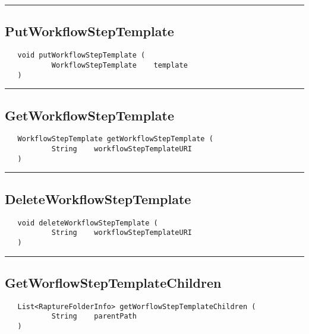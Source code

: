 \rule{15cm}{2pt}
\subsection{PutWorkflowStepTemplate}
\label{Api:PutWorkflowStepTemplate}
\begin{verbatim}
   void putWorkflowStepTemplate (
           WorkflowStepTemplate    template
   )
\end{verbatim}



\rule{15cm}{2pt}
\subsection{GetWorkflowStepTemplate}
\label{Api:GetWorkflowStepTemplate}
\begin{verbatim}
   WorkflowStepTemplate getWorkflowStepTemplate (
           String    workflowStepTemplateURI
   )
\end{verbatim}



\rule{15cm}{2pt}
\subsection{DeleteWorkflowStepTemplate}
\label{Api:DeleteWorkflowStepTemplate}
\begin{verbatim}
   void deleteWorkflowStepTemplate (
           String    workflowStepTemplateURI
   )
\end{verbatim}



\rule{15cm}{2pt}
\subsection{GetWorflowStepTemplateChildren}
\label{Api:GetWorflowStepTemplateChildren}
\begin{verbatim}
   List<RaptureFolderInfo> getWorflowStepTemplateChildren (
           String    parentPath
   )
\end{verbatim}



